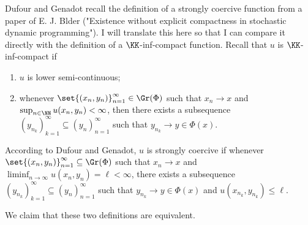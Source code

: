 Dufour and Genadot recall the definition of a strongly coercive function from
a paper of E. J. Blder ("Existence without explicit compactness in stochastic
dynamic programming"). I will translate this here so that I can compare it
directly with the definition of a $\KK$-inf-compact function. Recall that $u$
is $\KK$-inf-compact if 
\begin{enumerate}
  \item $u$ is lower semi-continuous;
  \item whenever $\set{(x_n,y_n)}_{n=1}^{\infty} \in \Gr(\Phi)$ such that $x_n
    \to x$ and $\sup_{n \in \NN} u(x_n, y_n) < \infty$, then there exists
    a subsequence $(y_{n_k})_{k=1}^{\infty} \subseteq (y_n)_{n=1}^{\infty}$
    such that $y_{n_k} \to y \in \Phi(x)$.
\end{enumerate}
According to Dufour and Genadot, $u$ is strongly coercive if whenever
$\set{(x_n, y_n)}_{n=1}^{\infty} \subseteq \Gr(\Phi)$ such that $x_n \to x$ and
$\liminf_{n \to \infty} u(x_n, y_n) = \ell < \infty$, there exists
a subsequence $(y_{n_k})_{k=1}^{\infty} \subseteq (y_n)_{n=1}^{\infty}$ such
that $y_{n_k} \to y \in \Phi(x)$ and $u(x_{n_k}, y_{n_k}) \leq \ell$.

We claim that these two definitions are equivalent.
